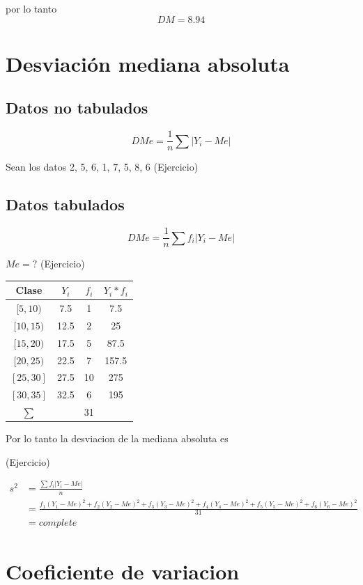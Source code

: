 \documentclass[10pt,]{krantz}
\theoremstyle{definition}
\theoremstyle{definition}
\theoremstyle{definition}
\theoremstyle{definition}
\theoremstyle{remark}
\begin{document}
por lo tanto \[DM=8.94\]

\hypertarget{desviaciuxf3n-mediana-absoluta}{%
\section{Desviación mediana absoluta}\label{desviaciuxf3n-mediana-absoluta}}

\hypertarget{datos-no-tabulados-2}{%
\subsection{Datos no tabulados}\label{datos-no-tabulados-2}}

\[DMe=\frac{1}{n}\sum \left\vert Y_i-Me\right\vert\]

Sean los datos 2, 5, 6, 1, 7, 5, 8, 6 (Ejercicio)

\hypertarget{datos-tabulados-2}{%
\subsection{Datos tabulados}\label{datos-tabulados-2}}

\[DMe=\frac{1}{n}\sum f_i \left \vert Y_i-Me\right\vert\]

\(Me=?\) (Ejercicio)

\begin{longtable}[]{@{}cccc@{}}
\toprule
Clase & \(Y_i\) & \(f_i\) & \(Y_i*f_i\)\tabularnewline
\midrule
\endhead
\([5,10)\) & 7.5 & 1 & 7.5\tabularnewline
\([10,15)\) & 12.5 & 2 & 25\tabularnewline
\([15,20)\) & 17.5 & 5 & 87.5\tabularnewline
\([20,25)\) & 22.5 & 7 & 157.5\tabularnewline
\([25,30]\) & 27.5 & 10 & 275\tabularnewline
\([30,35]\) & 32.5 & 6 & 195\tabularnewline
\(\sum\) & & 31 &\tabularnewline
\bottomrule
\end{longtable}

Por lo tanto la desviacion de la mediana absoluta es

(Ejercicio)

\[
\begin{aligned}
s^2&=\frac{\sum f_i\left \vert Y_i-Me\right \vert}{n}\\
&=\frac{f_1\left(Y_1-Me\right )^2+f_2\left(Y_2-Me\right )^2+f_3\left(Y_3-Me\right )^2+f_4\left(Y_4-Me\right )^2+f_5\left(Y_5-Me\right )^2+f_6\left(Y_6-Me\right )^2}{31}\\
&=complete
\end{aligned}
\]

\hypertarget{coeficiente-de-variacion}{%
\section{Coeficiente de variacion}\label{coeficiente-de-variacion}}
\end{document}
